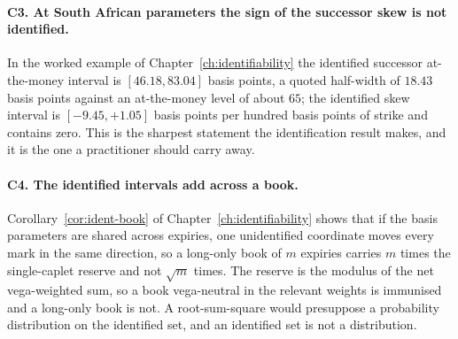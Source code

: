 \documentclass[../../../main.tex]{subfiles}
\begin{document}
\paragraph{C3. At South African parameters the sign of the successor skew is not identified.} In the worked example of Chapter~\ref{ch:identifiability} the identified successor at-the-money interval is $[46.18,83.04]$ basis points, a quoted half-width of $18.43$ basis points against an at-the-money level of about $65$; the identified skew interval is $[-9.45,+1.05]$ basis points per hundred basis points of strike and contains zero. This is the sharpest statement the identification result makes, and it is the one a practitioner should carry away.


\paragraph{C4. The identified intervals add across a book.} Corollary~\ref{cor:ident-book} of Chapter~\ref{ch:identifiability} shows that if the basis parameters are shared across expiries, one unidentified coordinate moves every mark in the same direction, so a long-only book of $m$ expiries carries $m$ times the single-caplet reserve and not $\sqrt m$ times. The reserve is the modulus of the net vega-weighted sum, so a book vega-neutral in the relevant weights is immunised and a long-only book is not. A root-sum-square would presuppose a probability distribution on the identified set, and an identified set is not a distribution.
\end{document}
